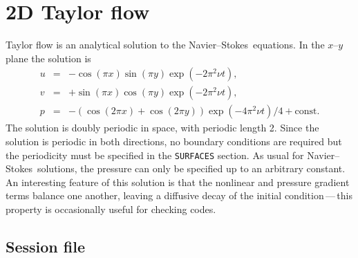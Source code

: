 \documentclass[11pt]{report}
\newcommand\NavSto{Navier--Stokes}
\begin{document}
\section{2D Taylor flow}
\label{sec.taylor}

Taylor flow is an analytical solution to the \NavSto\ equations.
In the $x$--$y$ plane the solution is 
\begin{eqnarray}
        u &=& -\cos(\pi x) \sin(\pi y) \exp(-2\pi^2\nu t),\\
        v &=& +\sin(\pi x) \cos(\pi y) \exp(-2\pi^2\nu t),\\
        p &=& -(\cos(2\pi x) + \cos(2\pi y)) \exp(-4\pi^2\nu t)/4
            + \textrm{const}.
\end{eqnarray}
The solution is doubly periodic in space, with periodic length 2.
Since the solution is periodic in both directions, no boundary
conditions are required but the periodicity must be specified in the
\verb|SURFACES| section.  As usual for \NavSto\ solutions, the
pressure can only be specified up to an arbitrary constant.  An
interesting feature of this solution is that the nonlinear and
pressure gradient terms balance one another, leaving a diffusive decay
of the initial condition\,---\,this property is occasionally useful for
checking codes.

\subsection{Session file}
\end{document}
